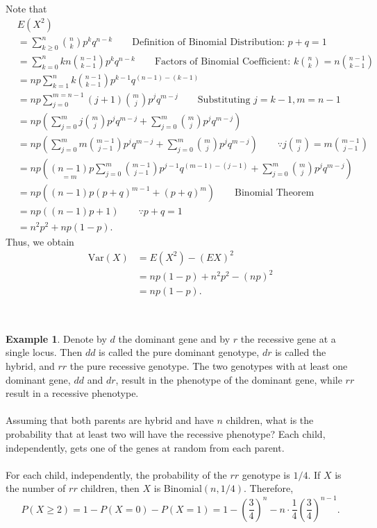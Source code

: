 \documentclass[12pt,a4paper]{article}
\theoremstyle{definition}
\newtheorem{example}{Example}[section]
\theoremstyle{definition}
\theoremstyle{definition}
\theoremstyle{definition}
\theoremstyle{remark}
\theoremstyle{definition}
\newcommand{\Var}{\text{Var}}
\begin{document}
\begin{tcolorbox}[colback=white]
	Note that \begin{align*}
	&E(X^2)\\
	&=\sum_{k\geq 0}^{n}\binom{n}{k}p^kq^{n-k} \qquad\text{Definition of Binomial Distribution: $p+q=1$}\\
	&=\sum_{k=0}^{n}kn\binom{n-1}{k-1}p^kq^{n-k} \qquad\text{Factors of Binomial Coefficient: $k\binom{n}{k}=n\binom{n-1}{k-1}$}\\
	&=np\sum_{k=1}^{n}k\binom{n-1}{k-1}p^{k-1}q^{(n-1)-(k-1)}\\
	&=np\sum_{j=0}^{m=n-1}(j+1)\binom{m}{j}p^jq^{m-j} \qquad\text{Substituting $j=k-1, m=n-1$}\\
	&=np\left(\sum_{j=0}^mj\binom{m}{j}p^jq^{m-j}+\sum_{j=0}^m\binom{m}{j}p^jq^{m-j}\right)\\
	&=np\left(\sum_{j=0}^mm\binom{m-1}{j-1}p^jq^{m-j}+\sum_{j=0}^m\binom{m}{j}p^jq^{m-j}\right)\qquad\because\text{$j\binom{m}{j}=m\binom{m-1}{j-1}$}\\
	&=np\left(\underset{=m}{(n-1)}p\sum_{j=0}^m\binom{m-1}{j-1}p^{j-1}q^{(m-1)-(j-1)}+\sum_{j=0}^m\binom{m}{j}p^jq^{m-j}\right)\\
	&=np\left((n-1)p(p+q)^{m-1}+(p+q)^m \right)\qquad\text{Binomial Theorem}\\
	&=np((n-1)p+1)\qquad\because p+q=1\\
	&=n^2p^2+np(1-p).
	\end{align*} Thus, we obtain \begin{align*}
	\Var(X)&=E(X^2)-(EX)^2\\
	&=np(1-p)+n^2p^2-(np)^2\\
	&=np(1-p).
	\end{align*}
\end{tcolorbox}
\
\begin{example}
	Denote by $d$ the dominant gene and by $r$ the recessive gene at a single locus. Then $dd$ is called the pure dominant genotype, $dr$ is called the hybrid, and $rr$ the pure recessive genotype. The two genotypes with at least one dominant gene, $dd$ and $dr$, result in the phenotype of the dominant gene, while $rr$ result in a recessive phenotype.\\
	\\
	Assuming that both parents are hybrid and have $n$ children, what is the probability that at least two will have the recessive phenotype? Each child, independently, gets one of the genes at random from each parent.\\
	\\
	For each child, independently, the probability of the $rr$ genotype is $1/4$. If $X$ is the number of $rr$ children, then $X$ is Binomial$(n,1/4)$. Therefore, \[
	P(X\geq 2)=1-P(X=0)-P(X=1)=1-\left(\frac{3}{4}\right)^n-n\cdot\frac{1}{4}\left(\frac{3}{4}\right)^{n-1}.
	\]
\end{example}
\end{document}
